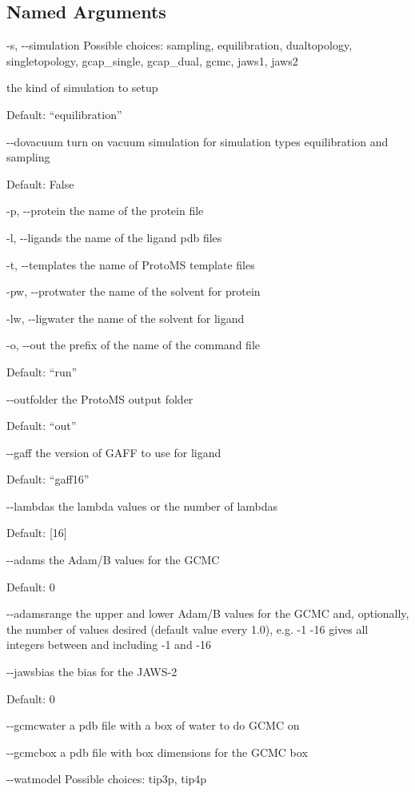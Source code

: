 \documentclass[letterpaper,10pt,english]{sphinxmanual}
\begin{document}
\subsection{Named Arguments}
\label{\detokenize{tools:Named Arguments}}\begin{optionlist}{3cm}
\item [-s, -{-}simulation]  
Possible choices: sampling, equilibration, dualtopology, singletopology, gcap\_single, gcap\_dual, gcmc, jaws1, jaws2

the kind of simulation to setup

Default: “equilibration”
\item [-{-}dovacuum]  
turn on vacuum simulation for simulation types equilibration and sampling

Default: False
\item [-p, -{-}protein]  
the name of the protein file
\item [-l, -{-}ligands]  
the name of the ligand pdb files
\item [-t, -{-}templates]  
the name of ProtoMS template files
\item [-pw, -{-}protwater]  
the name of the solvent for protein
\item [-lw, -{-}ligwater]  
the name of the solvent for ligand
\item [-o, -{-}out]  
the prefix of the name of the command file

Default: “run”
\item [-{-}outfolder]  
the ProtoMS output folder

Default: “out”
\item [-{-}gaff]  
the version of GAFF to use for ligand

Default: “gaff16”
\item [-{-}lambdas]  
the lambda values or the number of lambdas

Default: {[}16{]}
\item [-{-}adams]  
the Adam/B values for the GCMC

Default: 0
\item [-{-}adamsrange]  
the upper and lower Adam/B values for the GCMC and, optionally, the number of values desired (default value every 1.0), e.g. -1 -16 gives all integers between and including -1 and -16
\item [-{-}jawsbias]  
the bias for the JAWS-2

Default: 0
\item [-{-}gcmcwater]  
a pdb file with a box of water to do GCMC on
\item [-{-}gcmcbox]  
a pdb file with box dimensions for the GCMC box
\item [-{-}watmodel]  
Possible choices: tip3p, tip4p


\end{optionlist}
\end{document}
